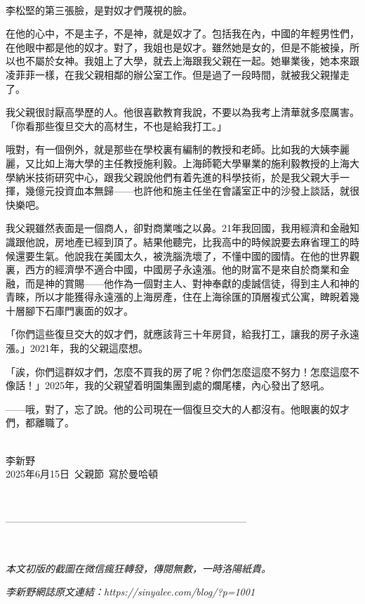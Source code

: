 \ 

李松堅的第三張臉，是對奴才們蔑視的臉。

在他的心中，不是主子，不是神，就是奴才了。包括我在內，中國的年輕男性們，在他眼中都是他的奴才。對了，我姐也是奴才。雖然她是女的，但是不能被操，所以也不屬於女神。我姐上了大學，就去上海跟我父親在一起。她畢業後，她本來跟凌菲菲一樣，在我父親相鄰的辦公室工作。但是過了一段時間，就被我父親攆走了。

我父親很討厭高學歷的人。他很喜歡教育我說，不要以為我考上清華就多麼厲害。「你看那些復旦交大的高材生，不也是給我打工。」

哦對，有一個例外，就是那些在學校裏有編制的教授和老師。比如我的大姨李麗麗，又比如上海大學的主任教授施利毅。上海師範大學畢業的施利毅教授的上海大學納米技術研究中心，跟我父親說他們有着先進的科學技術，於是我父親大手一揮，幾億元投資血本無歸——也許他和施主任坐在會議室正中的沙發上談話，就很快樂吧。

我父親雖然表面是一個商人，卻對商業嗤之以鼻。21年我回國，我用經濟和金融知識跟他說，房地產已經到頂了。結果他聽完，比我高中的時候說要去麻省理工的時候還要生氣。他說我在美國太久，被洗腦洗壞了，不懂中國的國情。在他的世界觀裏，西方的經濟學不適合中國，中國房子永遠漲。他的財富不是來自於商業和金融，而是神的賞賜——他作為一個對主人、對神奉獻的虔誠信徒，得到主人和神的青睞，所以才能獲得永遠漲的上海房產，住在上海徐匯的頂層複式公寓，睥睨着幾十層腳下石庫門裏面的奴才。

「你們這些復旦交大的奴才們，就應該背三十年房貸，給我打工，讓我的房子永遠漲。」2021年，我的父親這麼想。

「誒，你們這群奴才們，怎麼不買我的房了呢？你們怎麼這麼不努力！怎麼這麼不像話！」2025年，我的父親望着明園集團到處的爛尾樓，內心發出了怒吼。

——哦，對了，忘了說。他的公司現在一個復旦交大的人都沒有。他眼裏的奴才們，都離職了。

\ \\李新野\\
2025年6月15日\ 父親節\ 寫於曼哈頓


\ 

--------------------------------------------------------------------------

\ 

\textit{本文初版的截圖在微信瘋狂轉發，傳閱無數，一時洛陽紙貴。}

\textit{李新野網誌原文連結：https://sinyalee.com/blog/?p=1001}
